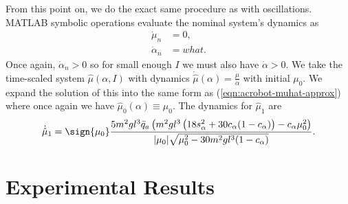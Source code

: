 From this point on, we do the exact same procedure as with oscillations.
MATLAB symbolic operations evaluate the nominal system's dynamics as
\begin{align}\label{eqn:acrobot-rot-mu-dot-nom}
    \dot{\mu}_n &= 0
    , \\
    \label{eqn:acrobot-rot-alpha-dot-nom}
    \dot{\alpha}_n &=  what
    .
\end{align}
Once again, \(\dot{\alpha}_n > 0\) so for small enough \(I\) we must also have
\(\dot{\alpha} > 0\).
We take the time-scaled system \(\hat{\mu}(\alpha,I)\) with dynamics 
\(\dot{\hat{\mu}}(\alpha) = \frac{\dot{\mu}}{\dot{\alpha}}\) with initial
\(\mu_0\).
We expand the solution of this into the same form as
(\ref{eqn:acrobot-muhat-approx}) where once again we have
\(\hat{\mu}_0(\alpha) \equiv \mu_0\).
The dynamics for \(\hat{\mu}_1\) are
\begin{equation}\label{eqn:acrobot-rot-mu1-dot}
    \dot{\hat{\mu}}_1 =
    \sign{\mu_0}\frac{5m^2 g l^3 \bar{q}_a \left(
        m^2gl^3\left(18s_\alpha^2 + 30c_\alpha(1 - c_\alpha)\right)
        - c_\alpha\mu_0^2
    \right)}{
    |\mu_0|\sqrt{\mu_0^2 - 30m^2gl^3(1 - c_\alpha)}
    }
    .
\end{equation}

\section{Experimental Results}

